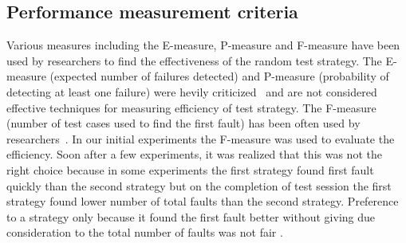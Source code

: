\documentclass[conference]{IEEEtran}
\begin{document}

\subsection{Performance measurement criteria}
Various measures including the E-measure, P-measure and F-measure have been used by researchers to find the effectiveness of the random test strategy. The E-measure (expected number of failures detected) and P-measure (probability of detecting at least one failure) were hevily criticized~\cite{Chen2008} and are not considered effective techniques for measuring efficiency of test strategy. The F-measure (number of test cases used to find the first fault) has been often used by researchers~\cite{Chen1996,Chen2004}. In our initial experiments the F-measure was used to evaluate the efficiency. Soon after a few experiments, it was realized that this was not the right choice because in some experiments the first strategy found first fault quickly than the second strategy but on the completion of test session the first strategy found lower number of total faults than the second strategy. Preference to a strategy only because it found the first fault better without giving due consideration to the total number of faults was not fair \cite{Liu2012}.


\end{document}

